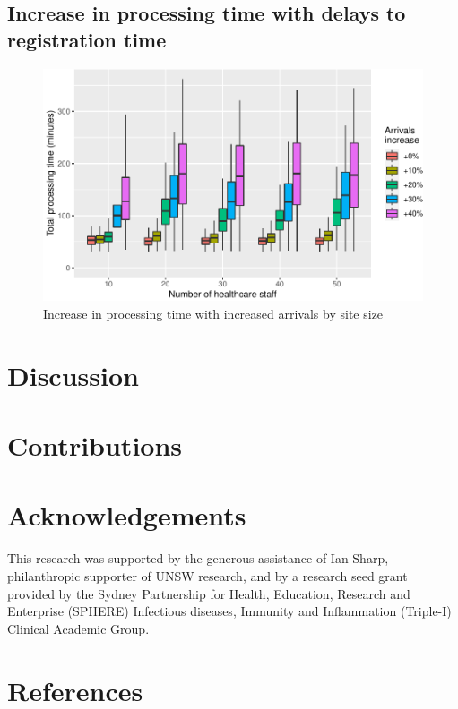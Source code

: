 \documentclass{article}
\begin{document}
\hypertarget{increase-in-processing-time-with-delays-to-registration-time}{%
\subsection{Increase in processing time with delays to registration
time}\label{increase-in-processing-time-with-delays-to-registration-time}}

\begin{figure}[h]

{\centering \includegraphics{Preprint_files/figure-latex/registrationTimeTest-1} 

}

\caption{Increase in processing time with increased arrivals by site size}\label{fig:registrationTimeTest}
\end{figure}

\hypertarget{discussion}{%
\section{Discussion}\label{discussion}}

\hypertarget{contributions}{%
\section{Contributions}\label{contributions}}

\hypertarget{acknowledgements}{%
\section{Acknowledgements}\label{acknowledgements}}

This research was supported by the generous assistance of Ian Sharp,
philanthropic supporter of UNSW research, and by a research seed grant
provided by the Sydney Partnership for Health, Education, Research and
Enterprise (SPHERE) Infectious diseases, Immunity and Inflammation
(Triple-I) Clinical Academic Group.

\newpage

\hypertarget{references}{%
\section{References}\label{references}}



\end{document}
